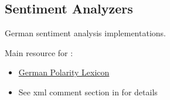 \documentclass[letterpaper,10pt,english]{sphinxmanual}
\begin{document}
\subsection{Sentiment Analyzers}
\label{api_reference:sentiment-analyzers}\label{api_reference:module-textblob_de.sentiments}
German sentiment analysis implementations.

Main resource for :
\begin{itemize}
\item {} 
\href{http://bics.sentimental.li/index.php/downloads}{German Polarity Lexicon}

\item {} 
See xml comment section in  for details

\end{itemize}
\end{document}
